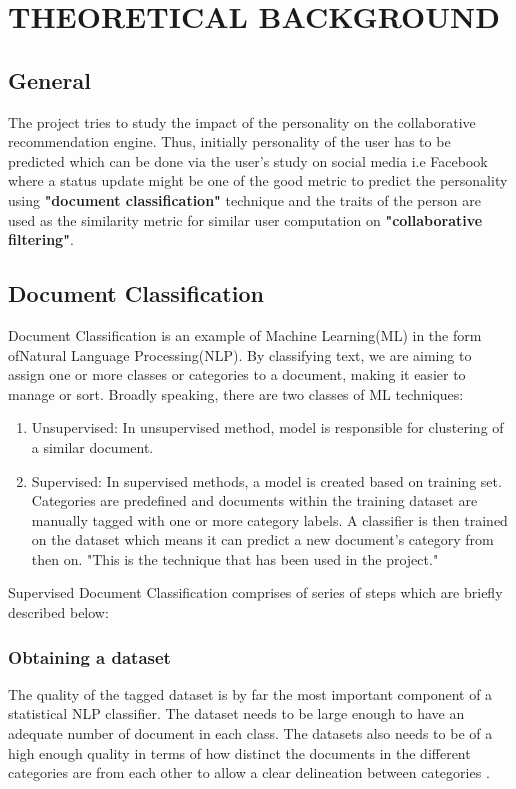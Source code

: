 \newpage
\section{THEORETICAL BACKGROUND}
\subsection{General}
The project tries to study the impact of the personality on the collaborative recommendation engine. Thus, initially personality of the user has to be predicted which can be done via the user's study on social media i.e Facebook where a status update might be one of the good metric to predict the personality using \textbf{"document classification"} technique and the traits of the person are used as the similarity metric for similar user computation on \textbf{"collaborative filtering"}.

\subsection{Document Classification}
Document Classification is an example of Machine Learning(ML) in the form ofNatural Language Processing(NLP). By classifying text, we are aiming to assign one or more classes or categories to a document, making it easier to manage or sort. 
Broadly speaking, there are two classes of ML techniques:
\begin{enumerate}
\item Unsupervised: In unsupervised method, model is responsible for clustering of a similar document.
\item Supervised: In supervised methods, a model is created based on training set. Categories are predefined and documents within the training dataset are manually tagged with one or more category labels. A classifier is then trained on the dataset which means it can predict a new document's category from then on. "This is the technique that has been used in the project."
\end{enumerate}

Supervised Document Classification comprises of series of steps which are briefly described below:
\subsubsection{Obtaining a dataset}
The quality of the tagged dataset is by far the most important component of a statistical NLP classifier. The dataset needs to be large enough to have an adequate number of document in each class. The datasets also needs to be of a high enough quality in terms of how distinct the documents in the different categories are from each other to allow a clear delineation between categories \cite{kd}.

